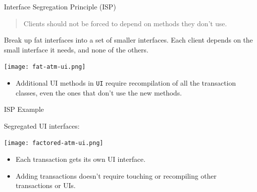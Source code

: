 \documentclass{beamer}
\begin{document}
\begin{frame}[fragile]{Interface Segregation Principle (ISP)}
\vspace{-.05in}
\begin{quote}
Clients should not be forced to depend on methods they don't use.
\end{quote}
Break up fat interfaces into a set of smaller interfaces.  Each client depends on the small interface it needs, and none of the others.
\vspace{-.05in}
\begin{center}
\texttt{[image: fat-atm-ui.png]}
\end{center}
\vspace{-.2in}
\begin{itemize}
\item Additional UI methods in {\tt UI} require recompilation of all the transaction classes, even the ones that don't use the new methods.
\end{itemize}


\end{frame}

\begin{frame}[fragile]{ISP Example}

\vspace{-.1in}
Segregated UI interfaces:
\vspace{-.1in}
\begin{center}
\texttt{[image: factored-atm-ui.png]}
\end{center}
\vspace{-.3in}
\begin{itemize}
\item Each transaction gets its own UI interface.
\item Adding transactions doesn't require touching or recompiling other transactions or UIs.
\end{itemize}


\end{frame}
\end{document}
